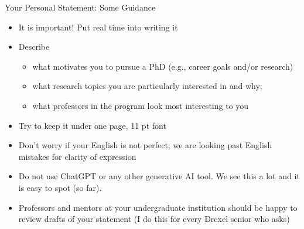 \begin{frame}[fragile]{Your Personal Statement: Some Guidance}
    \begin{itemize}
        \item It is important! Put real time into writing it
        \item Describe
        \begin{itemize}
            \item what motivates you to pursue a PhD (e.g., career goals and/or research)
            \item what research topics you are particularly interested in and why;
            \item what professors in the program look most interesting to you
        \end{itemize}
        \item Try to keep it under one page, 11 pt font
        \item Don't worry if your English is not perfect; we are looking past English mistakes for clarity of expression
        \item Do not use ChatGPT or any other generative AI tool. We see this a lot and it is easy to spot (so far).
        \item Professors and mentors at your undergraduate institution should be happy to review drafts of your statement (I do this for every Drexel senior who asks)
    \end{itemize}
\end{frame}

